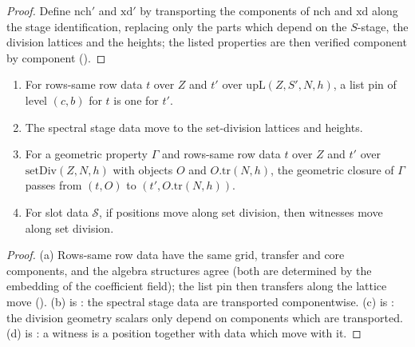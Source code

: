 \begin{proof}
Define $\mathrm{nch}'$ and $\mathrm{xd}'$ by transporting the components of $\mathrm{nch}$ and $\mathrm{xd}$ along the stage identification, replacing
only the parts which depend on the $S$-stage, the division lattices and the heights; the listed properties are then verified
component by component ().
\end{proof}

\begin{lemma}\label{pf:stageU:movetransport}
\begin{enumerate}[label=(\alph*)]
\item For rows-same row data $t$ over $Z$ and $t'$ over $\mathrm{upL}(Z,S',N,h)$, a list pin of level $(c,b)$ for $t$ is one for $t'$.
\item The spectral stage data move to the set-division lattices and heights.
\item For a geometric property $\Gamma$ and rows-same row data $t$ over $Z$ and $t'$ over $\mathrm{setDiv}(Z,N,h)$ with objects $O$ and
$O.\mathrm{tr}(N,h)$, the geometric closure of $\Gamma$ passes from $(t,O)$ to $(t',O.\mathrm{tr}(N,h))$.
\item For slot data $\mathcal S$, if positions move along set division, then witnesses move along set division.
\end{enumerate}
\end{lemma}

\begin{proof}
(a) Rows-same row data have the same grid, transfer and core components, and the algebra structures agree (both are determined by
the embedding of the coefficient field); the list pin then transfers along the lattice move
(). (b) is : the spectral stage data are
transported componentwise. (c) is : the division geometry scalars only depend on
components which are transported. (d) is : a witness is a position together
with data which move with it.
\end{proof}

